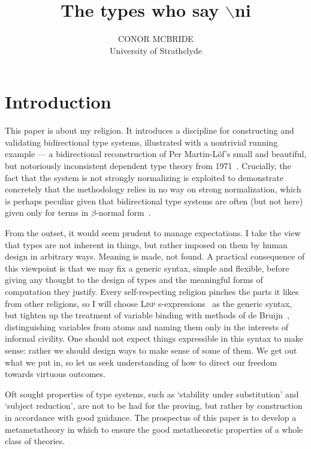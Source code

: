 \documentclass{jfp1}
\begin{document}
\title[Journal of Functional Programming]{The types who say $\backslash$ni}
\author[C. McBride]{CONOR MCBRIDE\\
  University of Strathclyde\\
  }
\maketitle

\section{Introduction}

This paper is about my religion. It introduces a discipline for
constructing and validating bidirectional type systems, illustrated
with a nontrivial running example --- a bidirectional reconstruction
of Per Martin-L\"of's small and beautiful, but notoriously
inconsistent dependent type theory from
1971~\cite{martinloef:atheoryoftypes}. Crucially, the fact that the
system is not strongly normalizing is exploited to demonstrate
concretely that the methodology relies in no way on strong
normalization, which is perhaps peculiar given that bidirectional type
systems are often (but not here) given only for terms in
$\beta$-normal form~\cite{DBLP:journals/toplas/PierceT00}.

From the outset, it would seem prudent to manage expectations. I take
the view that types are not inherent in things, but rather imposed on
them by human design in arbitrary ways. Meaning is made, not
found. A practical consequence of this viewpoint is that we may
fix a generic syntax, simple and flexible, before giving any thought
to the design of types and the meaningful forms of computation they
justify. Every self-respecting religion pinches the parts it likes
from other religions, so I will choose \textsc{Lisp} s-expressions~\cite{MCCARTHY60}
as the generic syntax, but tighten up the treatment of variable
binding with methods of de Bruijn~\cite{deBruijn:dummies},
distinguishing variables from atoms and naming them only in the
interests of informal civility. One should not expect things
expressible in this syntax to make sense: rather we should design
ways to make sense of some of them. We get out what we put
in, so let us seek understanding of how to direct our freedom towards virtuous
outcomes.

Oft sought properties of type systems, such as `stability under
substitution' and `subject reduction', are not to be had for the
proving, but rather by construction in accordance with good guidance.
The prospectus of this paper is to develop a metametatheory in which
to ensure the good metatheoretic properties of a whole class of theories.
\end{document}
